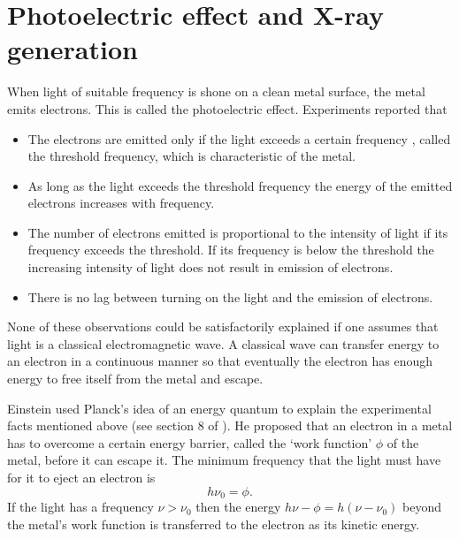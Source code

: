 \section{Photoelectric effect and X-ray generation}\label{c2s2}
When light of suitable frequency is shone on a clean metal surface, the metal
emits electrons. This is called the photoelectric effect. Experiments reported
that
\begin{itemize}
\item The electrons are emitted only if the light exceeds a certain frequency
, called the threshold frequency, which is characteristic of the metal.
\item As long as the light exceeds the threshold frequency the energy of the 
emitted electrons increases with frequency.
\item The number of electrons emitted is proportional to the intensity of light
if its frequency exceeds the threshold. If its frequency is below the threshold
the increasing intensity of light does not result in emission of electrons.
\item There is no lag between turning on the light and the emission of electrons.
\end{itemize}

None of these observations could be satisfactorily explained if one assumes that
light is a classical electromagnetic wave. A classical wave can transfer energy
to an electron in a continuous manner so that eventually the electron has enough
energy to free itself from the metal and escape.

Einstein used Planck's idea of an energy quantum to explain the experimental 
facts mentioned above (see section 8 of \cite{einstein1905heuristic}). He 
proposed that an electron in a metal has to overcome a certain energy barrier,
called the `work function' $\phi$ of the metal, before it can escape it. The
minimum frequency that the light must have for it to eject an electron is
\begin{equation}\label{c2s2e1}
h\nu_0 = \phi.
\end{equation}
If the light has a frequency $\nu > \nu_0$ then the energy $h\nu - \phi =
h(\nu - \nu_0)$ beyond the metal's work function is transferred to the
electron as its kinetic energy.

